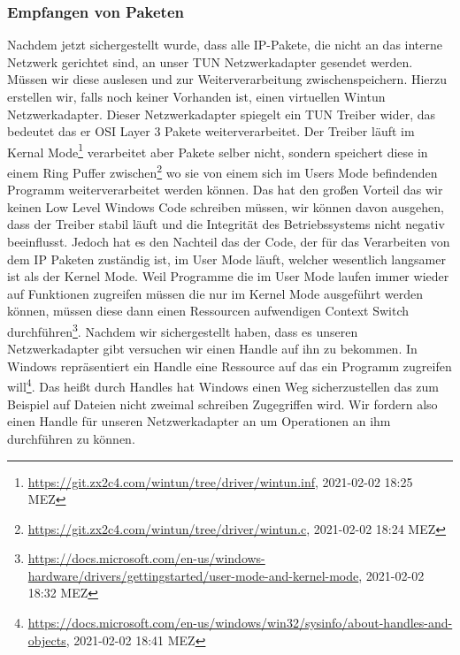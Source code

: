 \subsubsection{Empfangen von Paketen}
Nachdem jetzt sichergestellt wurde, dass alle IP-Pakete, die nicht an das interne Netzwerk gerichtet sind, an unser TUN Netzwerkadapter gesendet werden. Müssen wir diese auslesen und zur Weiterverarbeitung zwischenspeichern.
\newline
\newline
Hierzu erstellen wir, falls noch keiner Vorhanden ist, einen virtuellen Wintun Netzwerkadapter. Dieser Netzwerkadapter spiegelt ein TUN Treiber wider, das bedeutet das er OSI Layer 3 Pakete weiterverarbeitet. Der Treiber läuft im Kernal Mode\footnote[1]{\url{https://git.zx2c4.com/wintun/tree/driver/wintun.inf}, 2021-02-02 18:25 MEZ} verarbeitet aber Pakete selber nicht, sondern speichert diese in einem Ring Puffer zwischen\footnote[2]{\url{https://git.zx2c4.com/wintun/tree/driver/wintun.c}, 2021-02-02 18:24 MEZ} wo sie von einem sich im Users Mode befindenden Programm weiterverarbeitet werden können. Das hat den großen Vorteil das wir keinen Low Level Windows Code schreiben müssen, wir können davon ausgehen, dass der Treiber stabil läuft und die Integrität des Betriebssystems nicht negativ beeinflusst. Jedoch hat es den Nachteil das der Code, der für das Verarbeiten von dem IP Paketen zuständig ist, im User Mode läuft, welcher wesentlich langsamer ist als der Kernel Mode. Weil Programme die im User Mode laufen immer wieder auf Funktionen zugreifen müssen die nur im Kernel Mode ausgeführt werden können, müssen diese dann einen Ressourcen aufwendigen Context Switch durchführen\footnote[3]{\url{https://docs.microsoft.com/en-us/windows-hardware/drivers/gettingstarted/user-mode-and-kernel-mode}, 2021-02-02 18:32 MEZ}.
\newline
\newline
Nachdem wir sichergestellt haben, dass es unseren Netzwerkadapter gibt versuchen wir einen Handle auf ihn zu bekommen. In Windows repräsentiert ein Handle eine Ressource auf das ein Programm zugreifen will\footnote[1]{\url{https://docs.microsoft.com/en-us/windows/win32/sysinfo/about-handles-and-objects}, 2021-02-02 18:41 MEZ}. Das heißt durch Handles hat Windows einen Weg sicherzustellen das zum Beispiel auf Dateien nicht zweimal schreiben Zugegriffen wird. Wir fordern also einen Handle für unseren Netzwerkadapter an um Operationen an ihm durchführen zu können.
\newline
\newline
